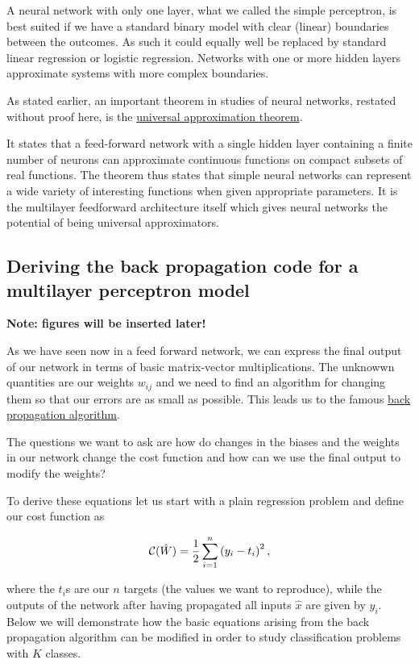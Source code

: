 \documentclass[%
oneside,                 %
final,                   %
10pt]{article}
\begin{document}
A neural network with only one layer, what we called the simple
perceptron, is best suited if we have a standard binary model with
clear (linear) boundaries between the outcomes. As such it could
equally well be replaced by standard linear regression or logistic
regression. Networks with one or more hidden layers approximate
systems with more complex boundaries.

As stated earlier, 
an important theorem in studies of neural networks, restated without
proof here, is the \href{{http://citeseerx.ist.psu.edu/viewdoc/download?doi=10.1.1.441.7873&rep=rep1&type=pdf}}{universal approximation
theorem}.

It states that a feed-forward network with a single hidden layer
containing a finite number of neurons can approximate continuous
functions on compact subsets of real functions. The theorem thus
states that simple neural networks can represent a wide variety of
interesting functions when given appropriate parameters. It is the
multilayer feedforward architecture itself which gives neural networks
the potential of being universal approximators.


\subsection*{Deriving the back propagation code for a multilayer perceptron model}


\textbf{Note: figures will be inserted later!}

As we have seen now in a feed forward network, we can express the final output of our network in terms of basic matrix-vector multiplications.
The unknowwn quantities are our weights $w_{ij}$ and we need to find an algorithm for changing them so that our errors are as small as possible.
This leads us to the famous \href{{https://www.nature.com/articles/323533a0}}{back propagation algorithm}.

The questions we want to ask are how do changes in the biases and the
weights in our network change the cost function and how can we use the
final output to modify the weights?

To derive these equations let us start with a plain regression problem
and define our cost function as

\[
{\cal C}(\hat{W})  =  \frac{1}{2}\sum_{i=1}^n\left(y_i - t_i\right)^2, 
\]

where the $t_i$s are our $n$ targets (the values we want to
reproduce), while the outputs of the network after having propagated
all inputs $\hat{x}$ are given by $y_i$.  Below we will demonstrate
how the basic equations arising from the back propagation algorithm
can be modified in order to study classification problems with $K$
classes.
\end{document}
